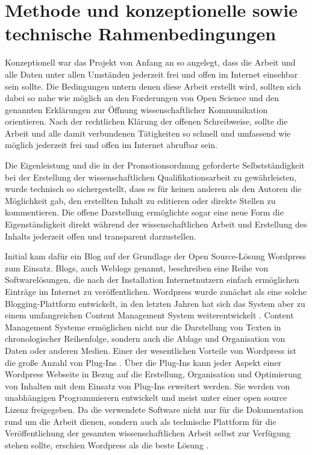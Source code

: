 \section{Methode und konzeptionelle sowie technische Rahmenbedingungen}

Konzeptionell war das Projekt von Anfang an so angelegt, dass die Arbeit und alle Daten unter allen Umständen jederzeit frei und offen im Internet einsehbar sein sollte. Die Bedingungen untern denen diese Arbeit erstellt wird, sollten sich dabei so nahe wie möglich an den Forderungen von Open Science und den genannten Erklärungen zur Öffnung wissenschaftlicher Kommunikation orientieren. Nach der rechtlichen Klärung der offenen Schreibweise, sollte die Arbeit und alle damit verbundenen Tätigkeiten so schnell und umfassend wie möglich jederzeit frei und offen im Internet abrufbar sein.

Die Eigenleistung und die in der Promotionsordnung geforderte \cite{promotionsordnung_leuphana_kuwi_2011} Selbstständigkeit bei der Erstellung der wissenschaftlichen Qualifikationsarbeit zu gewährleisten, wurde technisch so sichergestellt, dass es für keinen anderen als den Autoren die Möglichkeit gab, den erstellten Inhalt zu editieren oder direkte Stellen zu kommentieren. Die offene Darstellung ermöglichte sogar eine neue Form die Eigenständigkeit direkt während der wissenschaftlichen Arbeit und Erstellung des Inhalts jederzeit offen und transparent darzustellen.

Initial kam dafür ein Blog auf der Grundlage der Open Source-Lösung Wordpress zum Einsatz. Blogs, auch Weblogs genannt, beschreiben eine Reihe von Softwarelösungen, die nach der Installation Internetnutzern einfach ermöglichen Einträge im Internet zu veröffentlichen. Wordpress wurde zunächst als eine solche Blogging-Plattform entwickelt, in den letzten Jahren hat sich das System aber zu einem umfangreichen Content Management System weiterentwickelt \cite{Patel_2011_cms}. Content Management Systeme ermöglichen nicht nur die Darstellung von Texten in chronologischer Reihenfolge, sondern auch die Ablage und Organisation von Daten oder anderen Medien. Einer der wesentlichen Vorteile von Wordpress ist die große Anzahl von Plug-Ins \cite{Patel_2011_cms}. Über die Plug-Ins kann jeder Aspekt einer Wordpress Webseite in Bezug auf die Erstellung, Organisation und Optimierung von Inhalten mit dem Einsatz von Plug-Ins erweitert werden. Sie werden von unabhängigen Programmierern entwickelt und meist unter einer open source Lizenz freigegeben. Da die verwendete Software nicht nur für die Dokumentation rund um die Arbeit dienen, sondern auch als technische Plattform für die Veröffentlichung der gesamten wissenschaftlichen Arbeit selbst zur Verfügung stehen sollte, erschien Wordpress als die beste Lösung \cite{Jones_2013_CMS}.

